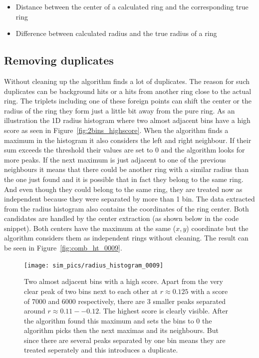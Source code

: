 \documentclass[11pt,twoside]{scrreprt}
\begin{document}
\begin{itemize}
  \item Distance between the center of a calculated ring and the corresponding true ring
  \item Difference between calculated radius and the true radius of a ring
\end{itemize}

\subsection{Removing duplicates} %
\label{ssub:getting_rid_of_duplicates}


Without cleaning up the algorithm finds a lot of duplicates. The reason for such duplicates can be background hits or a hits from another 
ring close to the actual ring. The triplets including one of these foreign points can shift the center or the radius of the ring
they form just a little bit away from the pure ring. As an illustration the 1D radius histogram where two almost adjacent bins 
have a high score as seen in Figure~\ref{fig:2bins_highscore}. When the algorithm finds a maximum in the histogram it also considers the 
left and right neighbour. If their sum exceeds the threshold their values are set to 0 and the algorithm looks for more peaks. If the next
maximum is just adjacent to one of the previous neighbours it means that there could be another ring with a similar radius than the one
just found and it is possible that in fact they belong to the same ring.
And even though they could belong to the same ring, they are treated now as independent because they were separated by more than 1 bin.
The data extracted from the radius histogram also contains the coordinates of the ring center. Both candidates are handled by the center 
extraction (as shown below in the code snippet). Both centers have the maximum at the same ($x,y$) coordinate but the algorithm considers 
them as independent rings without cleaning. The result can be seen in Figure~\ref{fig:comb_ht_0009}.



\begin{figure}[htb]
  \centering
  \texttt{[image: sim\_pics/radius\_histogram\_0009]}
  \caption[Histogram of duplicates]{Two almost adjacent bins with a high score\label{fig:2bins_highscore}. Apart from the very clear peak of two bins next to each
  other at $r \approx 0.125$ with a score of 7000 and 6000 respectively, there are 3 smaller peaks separated around $r \approx 0.11--0.12$.
  The highest score is clearly visible. After the algorithm found this maximum and sets the bins to 0 the algorithm picks then the next
  maximas and its neighbours. But since there are several peaks separated by one bin means they are treated seperately and this introduces
  a duplicate.}
  \label{fig:bin_peak}
\end{figure}
\end{document}
